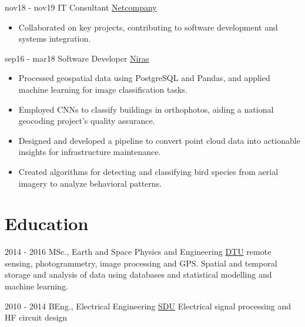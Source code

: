 \documentclass[letterpaper]{twentysecondcv} %
\begin{document}
\begin{twenty}
\twentyitem
    {nov18 - nov19}
    {}
    {IT Consultant}
    {\href{https://www.netcompany.com/}{Netcompany}}
    {}
    {
        \begin{itemize}
            \item Collaborated on key projects, contributing to software development and systems integration.
        \end{itemize}
      \bigskip %
    }

        

\twentyitem
    	{sep16 - mar18}
		{}
        { Software Developer}
        {\href{https://www.niras.dk/ydelser/gis-geodata-og-automation/}{Niras}}
        {}
        {
            \begin{itemize}
                \item Processed geospatial data using PostgreSQL and Pandas, and applied machine learning for image classification tasks.
                \item Employed CNNs to classify buildings in orthophotos, aiding a national geocoding project's quality assurance.
                \item Designed and developed a pipeline to convert point cloud data into actionable insights for infrastructure maintenance.
                \item Created algorithms for detecting and classifying bird species from aerial imagery to analyze behavioral patterns.
                \break
            \end{itemize}
        }
   

\end{twenty}


\section{Education}

\begin{twenty} %
	\twentyitem
    	{2014 - 2016}
        {}
        {MSc., Earth and Space Physics and Engineering}
        {\href{http://www.dtu.dk/english/education/msc/programmes/earth_and_space_physics_and_engineering}{DTU}}
        {}
        {
        remote sensing, photogrammetry, image processing and GPS.
        Spatial and temporal storage and analysis of data using databases and statistical modelling and machine learning.
        \bigskip %
        }
        
        
	\twentyitem
    	{2010 - 2014}
		{}
        {BEng., Electrical Engineering}
        {\href{http://sdu.dk}{SDU}}
        {}
        {
            Electrical signal processing and HF circuit design 
        }
	
\end{twenty}
\end{document}
